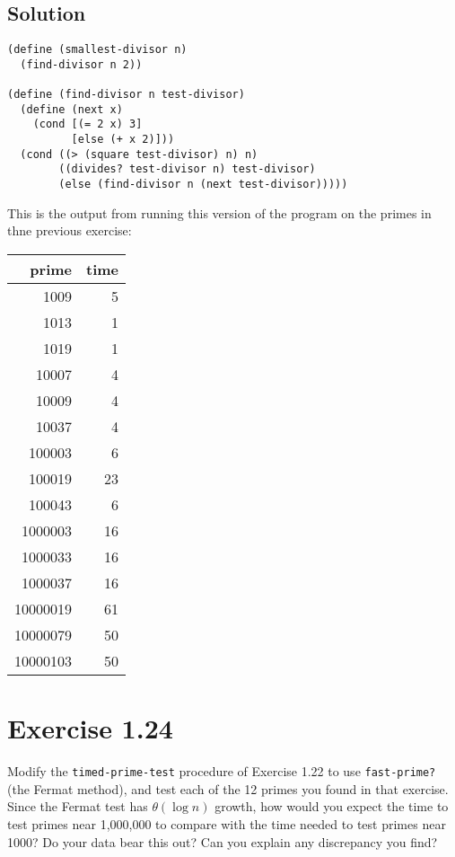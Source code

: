 \documentclass[11pt]{article}
\begin{document}
\subsection{Solution}
\label{sec:org4441bec}
\begin{verbatim}
(define (smallest-divisor n)
  (find-divisor n 2))

(define (find-divisor n test-divisor)
  (define (next x)
    (cond [(= 2 x) 3]
          [else (+ x 2)]))
  (cond ((> (square test-divisor) n) n)
        ((divides? test-divisor n) test-divisor)
        (else (find-divisor n (next test-divisor)))))
\end{verbatim}
This is the output from running this version of the program on the primes in
thne previous exercise:
\begin{center}
\begin{tabular}{rr}
prime & time\\
\hline
1009 & 5\\
1013 & 1\\
1019 & 1\\
10007 & 4\\
10009 & 4\\
10037 & 4\\
100003 & 6\\
100019 & 23\\
100043 & 6\\
1000003 & 16\\
1000033 & 16\\
1000037 & 16\\
10000019 & 61\\
10000079 & 50\\
10000103 & 50\\
\end{tabular}
\end{center}
\section{Exercise 1.24}
\label{sec:orgccbd820}
Modify the \texttt{timed-prime-test} procedure of Exercise 1.22 to use \texttt{fast-prime?}
(the Fermat method), and test each of the 12 primes you found in that
exercise. Since the Fermat test has \(\theta(\log n)\) growth, how would you
expect the time to test primes near 1,000,000 to compare with the time needed
to test primes near 1000? Do your data bear this out? Can you explain any
discrepancy you find?
\end{document}
